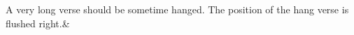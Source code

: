 \documentclass{article}
\begin{document}
 \renewcommand{\hangingsymbol}{\protect\hfill[}
 \beginnumbering
 	\stanza
   A very long verse should be sometime hanged. The position of the hang verse is flushed right.\&
 \endnumbering
\end{document}
